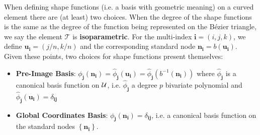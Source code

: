 When defining shape functions (i.e. a basis with geometric meaning) on a
curved element there are (at least) two choices. When the degree of the
shape functions is the same as the degree of the function being
represented on the B\'{e}zier triangle,
we say the element \(\mathcal{T}\) is \textbf{isoparametric}.
For the multi-index
\(\bm{i} = (i, j , k)\), we define \(\bm{u}_{\bm{i}} =
\left(j/n, k/n\right)\) and the corresponding standard node
\(\bm{n}_{\bm{i}} = b\left(\bm{u}_{\bm{i}}\right)\).
Given these points, two choices for shape functions present
themselves:
\begin{itemize}
  \itemsep 0em
  \item \textbf{Pre-Image Basis}:
    \(\phi_{\bm{j}}\left(\bm{n}_{\bm{i}}\right) =
      \widehat{\phi}_{\bm{j}}\left(\bm{u}_{\bm{i}}\right) =
      \widehat{\phi}_{\bm{j}}\left(b^{-1}\left(
      \bm{n}_{\bm{i}}\right)\right)\)
    where \(\widehat{\phi}_{\bm{j}}\) is a canonical basis function
    on \(\mathcal{U}\), i.e.
    \(\widehat{\phi}_{\bm{j}}\) a degree \(p\) bivariate polynomial and
    \(\widehat{\phi}_{\bm{j}}\left(\bm{u}_{\bm{i}}\right) =
    \delta_{\bm{i} \bm{j}}\)
  \item \textbf{Global Coordinates Basis}:
    \(\phi_{\bm{j}}\left(\bm{n}_{\bm{i}}\right) =
    \delta_{\bm{i} \bm{j}}\), i.e. a canonical basis function
    on the standard nodes \(\left\{\bm{n}_{\bm{i}}\right\}\).
\end{itemize}

